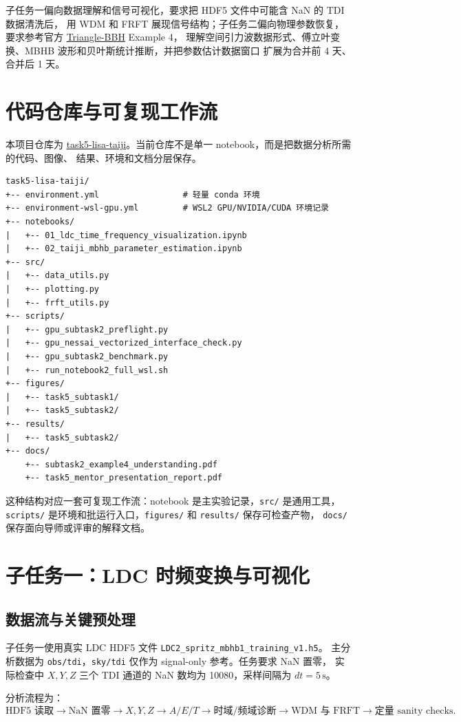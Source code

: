 \documentclass[11pt,a4paper]{ctexart}
\newcommand{\repo}{\href{https://github.com/leichang131-debug/task5-lisa-taiji}{task5-lisa-taiji}}
\newcommand{\official}{\href{https://github.com/TriangleDataCenter/Triangle-BBH}{Triangle-BBH}}
\begin{document}
子任务一偏向数据理解和信号可视化，要求把 HDF5 文件中可能含 NaN 的 TDI 数据清洗后，
用 WDM 和 FRFT 展现信号结构；子任务二偏向物理参数恢复，要求参考官方 \official{} Example 4，
理解空间引力波数据形式、傅立叶变换、MBHB 波形和贝叶斯统计推断，并把参数估计数据窗口
扩展为合并前 4 天、合并后 1 天。

\section{代码仓库与可复现工作流}

本项目仓库为 \repo{}。当前仓库不是单一 notebook，而是把数据分析所需的代码、图像、
结果、环境和文档分层保存。

\begin{verbatim}
task5-lisa-taiji/
+-- environment.yml                 # 轻量 conda 环境
+-- environment-wsl-gpu.yml         # WSL2 GPU/NVIDIA/CUDA 环境记录
+-- notebooks/
|   +-- 01_ldc_time_frequency_visualization.ipynb
|   +-- 02_taiji_mbhb_parameter_estimation.ipynb
+-- src/
|   +-- data_utils.py
|   +-- plotting.py
|   +-- frft_utils.py
+-- scripts/
|   +-- gpu_subtask2_preflight.py
|   +-- gpu_nessai_vectorized_interface_check.py
|   +-- gpu_subtask2_benchmark.py
|   +-- run_notebook2_full_wsl.sh
+-- figures/
|   +-- task5_subtask1/
|   +-- task5_subtask2/
+-- results/
|   +-- task5_subtask2/
+-- docs/
    +-- subtask2_example4_understanding.pdf
    +-- task5_mentor_presentation_report.pdf
\end{verbatim}

这种结构对应一套可复现工作流：notebook 是主实验记录，\texttt{src/} 是通用工具，
\texttt{scripts/} 是环境和批运行入口，\texttt{figures/} 和 \texttt{results/} 保存可检查产物，
\texttt{docs/} 保存面向导师或评审的解释文档。

\section{子任务一：LDC 时频变换与可视化}

\subsection{数据流与关键预处理}

子任务一使用真实 LDC HDF5 文件 \texttt{LDC2\_spritz\_mbhb1\_training\_v1.h5}。
主分析数据为 \texttt{obs/tdi}，\texttt{sky/tdi} 仅作为 signal-only 参考。任务要求 NaN 置零，
实际检查中 \(X,Y,Z\) 三个 TDI 通道的 NaN 数均为 10080，采样间隔为 \(dt=5\,\mathrm{s}\)。

分析流程为：
\[
\text{HDF5 读取}
\rightarrow
\text{NaN 置零}
\rightarrow
X,Y,Z \rightarrow A/E/T
\rightarrow
\text{时域/频域诊断}
\rightarrow
\text{WDM 与 FRFT}
\rightarrow
\text{定量 sanity checks}.
\]
\end{document}
